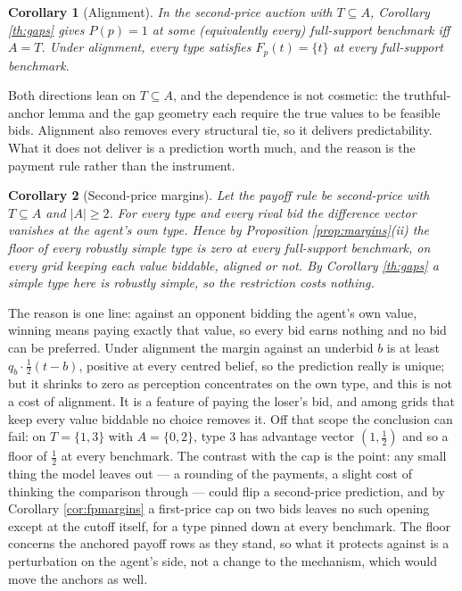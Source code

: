 \documentclass[12pt]{article}
\newtheorem{corollary}{Corollary}
\theoremstyle{definition}
\begin{document}
\begin{corollary}[Alignment]\label{cor:align}
In the second-price auction with $T\subseteq A$, Corollary \ref{th:gaps} gives $P(p)=1$ at some (equivalently every) full-support benchmark iff $A=T$. Under alignment, every type satisfies $F_p(t)=\{t\}$ at every full-support benchmark.
\end{corollary}

Both directions lean on $T \subseteq A$, and the dependence is not cosmetic: the truthful-anchor lemma and the gap geometry each require the true values to be feasible bids. Alignment also removes every structural tie, so it delivers predictability. What it does not deliver is a prediction worth much, and the reason is the payment rule rather than the instrument.

\begin{corollary}[Second-price margins]\label{cor:spamargins}
Let the payoff rule be second-price with $T \subseteq A$ and $|A| \ge 2$. For every type and every rival bid the difference vector vanishes at the agent's own type. Hence by Proposition \ref{prop:margins}(ii) the floor of every robustly simple type is zero at every full-support benchmark, on every grid keeping each value biddable, aligned or not. By Corollary \ref{th:gaps} a simple type here is robustly simple, so the restriction costs nothing.
\end{corollary}

The reason is one line: against an opponent bidding the agent's own value, winning means paying exactly that value, so every bid earns nothing and no bid can be preferred. Under alignment the margin against an underbid $b$ is at least $q_b \cdot \tfrac12 (t - b)$, positive at every centred belief, so the prediction really is unique; but it shrinks to zero as perception concentrates on the own type, and this is not a cost of alignment. It is a feature of paying the loser's bid, and among grids that keep every value biddable no choice removes it. Off that scope the conclusion can fail: on $T = \{1,3\}$ with $A = \{0,2\}$, type 3 has advantage vector $(1, \tfrac12)$ and so a floor of $\tfrac12$ at every benchmark. The contrast with the cap is the point: any small thing the model leaves out --- a rounding of the payments, a slight cost of thinking the comparison through --- could flip a second-price prediction, and by Corollary \ref{cor:fpmargins} a first-price cap on two bids leaves no such opening except at the cutoff itself, for a type pinned down at every benchmark. The floor concerns the anchored payoff rows as they stand, so what it protects against is a perturbation on the agent's side, not a change to the mechanism, which would move the anchors as well.
 
\end{document}
